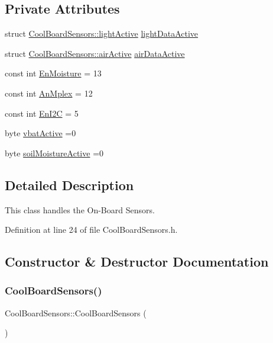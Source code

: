 \subsection*{Private Attributes}
\begin{DoxyCompactItemize}
\item 
struct \hyperlink{structCoolBoardSensors_1_1lightActive}{Cool\+Board\+Sensors\+::light\+Active} \hyperlink{classCoolBoardSensors_ac4deb1cf41bac8b91c780c92fab00ba4}{light\+Data\+Active}
\item 
struct \hyperlink{structCoolBoardSensors_1_1airActive}{Cool\+Board\+Sensors\+::air\+Active} \hyperlink{classCoolBoardSensors_abff8dfeccb2f7689847bb64d5f1cd31e}{air\+Data\+Active}
\item 
const int \hyperlink{classCoolBoardSensors_a6177d02e14a057a2f171a2e930b5038d}{En\+Moisture} = 13
\item 
const int \hyperlink{classCoolBoardSensors_a12ef28b1046219e0aee10bf64e28c4a5}{An\+Mplex} = 12
\item 
const int \hyperlink{classCoolBoardSensors_aaa6b5dbf3a6633bffd9d204d961096dc}{En\+I2C} = 5
\item 
byte \hyperlink{classCoolBoardSensors_af5039ad760b0ff0aa7eee16c55e81702}{vbat\+Active} =0
\item 
byte \hyperlink{classCoolBoardSensors_a31983eecc0f9cd000e1f912206ea4dc8}{soil\+Moisture\+Active} =0
\end{DoxyCompactItemize}


\subsection{Detailed Description}
This class handles the On-\/\+Board Sensors. 

Definition at line 24 of file Cool\+Board\+Sensors.\+h.



\subsection{Constructor \& Destructor Documentation}
\mbox{\label{classCoolBoardSensors_a91ff2a02f5486f90cf2413a1cf8a9ed4}} 
\subsubsection{\texorpdfstring{Cool\+Board\+Sensors()}{CoolBoardSensors()}}
{\footnotesize\ttfamily Cool\+Board\+Sensors\+::\+Cool\+Board\+Sensors (\begin{DoxyParamCaption}{ }\end{DoxyParamCaption})}

